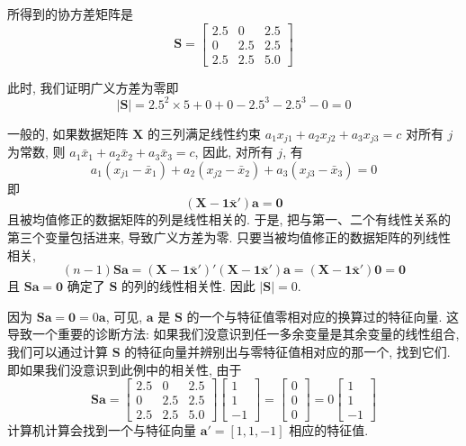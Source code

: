 
所得到的协方差矩阵是
\[
\mathbf{S}=\begin{bmatrix}2.5&0&2.5\\0&2.5&2.5\\2.5&2.5&5.0\end{bmatrix}
\]

此时, 我们证明广义方差为零即
\[
|\mathbf{S}|=2.5^{2}\times5+0+0-2.5^{3}-2.5^{3}-0=0
\]

一般的, 如果数据矩阵 $\mathbf{X}$ 的三列满足线性约束 $a_{1}x_{j1}+a_{2}x_{j2}+a_{3}x_{j3}=c$ 对所有 $j$ 为常数, 则 $a_{1}\bar{x}_{1}+a_{2}\bar{x}_{2}+a_{3}\bar{x}_{3}=c$, 因此, 对所有 $j$, 有
\[
a_{1}(x_{j1}-\bar{x}_{1})+a_{2}(x_{j2}-\bar{x}_{2})+a_{3}(x_{j3}-\bar{x}_{3})=0
\]
即
\[
(\mathbf{X}-\mathbf{1}\bar{\mathbf{x}}')\mathbf{a}=\mathbf{0}
\]
且被均值修正的数据矩阵的列是线性相关的. 于是, 把与第一、二个有线性关系的第三个变量包括进来, 导致广义方差为零. 只要当被均值修正的数据矩阵的列线性相关,
\[
(n-1)\mathbf{S}\mathbf{a}=(\mathbf{X}-\mathbf{1}\bar{\mathbf{x}}')'(\mathbf{X}-\mathbf{1}\bar{\mathbf{x}}')\mathbf{a}=(\mathbf{X}-\mathbf{1}\bar{\mathbf{x}}')\mathbf{0}=\mathbf{0}
\]
且 $\mathbf{S}\mathbf{a}=\mathbf{0}$ 确定了 $\mathbf{S}$ 的列的线性相关性. 因此 $|\mathbf{S}|=0$.

因为 $\mathbf{S}\mathbf{a}=\mathbf{0}=0\mathbf{a}$, 可见, $\mathbf{a}$ 是 $\mathbf{S}$ 的一个与特征值零相对应的换算过的特征向量. 这导致一个重要的诊断方法: 如果我们没意识到任一多余变量是其余变量的线性组合, 我们可以通过计算 $\mathbf{S}$ 的特征向量并辨别出与零特征值相对应的那一个, 找到它们. 即如果我们没意识到此例中的相关性, 由于
\[
\mathbf{S}\mathbf{a}=\begin{bmatrix}2.5&0&2.5\\0&2.5&2.5\\2.5&2.5&5.0\end{bmatrix}\begin{bmatrix}1\\1\\-1\end{bmatrix}=\begin{bmatrix}0\\0\\0\end{bmatrix}=0\begin{bmatrix}1\\1\\-1\end{bmatrix}
\]
计算机计算会找到一个与特征向量 $\mathbf{a}'=[1,1,-1]$ 相应的特征值.

